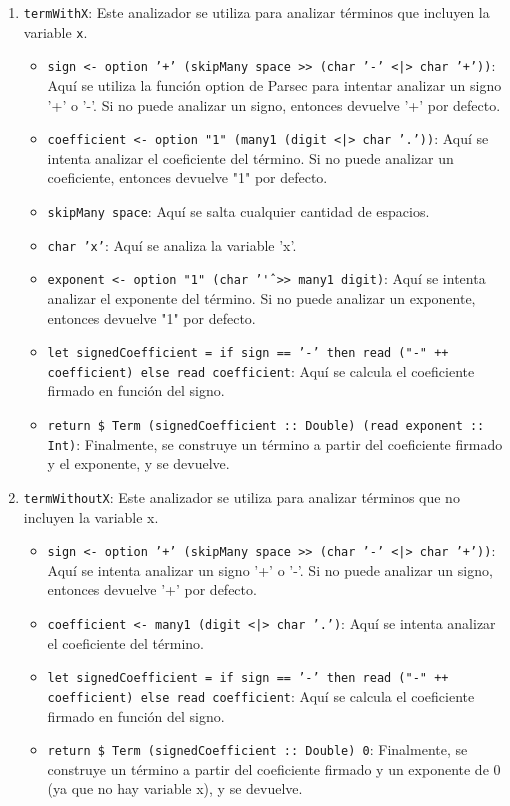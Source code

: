 \documentclass{article}
\begin{document}
\begin{enumerate}
  \item \texttt{termWithX}: Este analizador se utiliza para analizar términos que incluyen la variable \texttt{x}.
    \begin{itemize}
      \item \texttt{sign <- option '+' (skipMany space >> (char '-' <|> char '+'))}: Aquí se utiliza la función option de Parsec para intentar analizar un signo '+' o '-'. Si no puede analizar un signo, entonces devuelve '+' por defecto.
      \item \texttt{coefficient <- option "1" (many1 (digit <|> char '.'))}: Aquí se intenta analizar el coeficiente del término. Si no puede analizar un coeficiente, entonces devuelve "1" por defecto.
      \item \texttt{skipMany space}: Aquí se salta cualquier cantidad de espacios.
      \item \texttt{char 'x'}: Aquí se analiza la variable 'x'.
      \item \texttt{exponent <- option "1" (char '\^' >> many1 digit)}: Aquí se intenta analizar el exponente del término. Si no puede analizar un exponente, entonces devuelve "1" por defecto.
      \item \texttt{let signedCoefficient = if sign == '-' then read ("-" ++ coefficient) else read coefficient}: Aquí se calcula el coeficiente firmado en función del signo.
      \item \texttt{return \$ Term (signedCoefficient :: Double) (read exponent :: Int)}: Finalmente, se construye un término a partir del coeficiente firmado y el exponente, y se devuelve.
    \end{itemize}
  \item \texttt{termWithoutX}: Este analizador se utiliza para analizar términos que no incluyen la variable x.
    \begin{itemize}
      \item \texttt{sign <- option '+' (skipMany space >> (char '-' <|> char '+'))}: Aquí se intenta analizar un signo '+' o '-'. Si no puede analizar un signo, entonces devuelve '+' por defecto.
      \item \texttt{coefficient <- many1 (digit <|> char '.')}: Aquí se intenta analizar el coeficiente del término.
      \item \texttt{let signedCoefficient = if sign == '-' then read ("-" ++ coefficient) else read coefficient}: Aquí se calcula el coeficiente firmado en función del signo.
      \item \texttt{return \$ Term (signedCoefficient :: Double) 0}: Finalmente, se construye un término a partir del coeficiente firmado y un exponente de 0 (ya que no hay variable x), y se devuelve.
    \end{itemize}
\end{enumerate}
\end{document}
